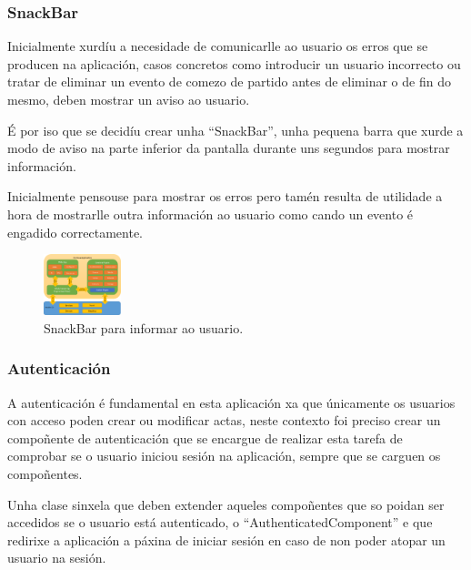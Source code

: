       \subsubsection{SnackBar}
      Inicialmente xurdíu a necesidade de comunicarlle ao usuario os erros que 
se producen na aplicación, casos concretos como introducir un usuario 
incorrecto ou tratar de eliminar un evento de comezo de partido antes de 
eliminar o de fin do mesmo, deben mostrar un aviso ao usuario.

      É por iso que se decidíu crear unha ``SnackBar'', unha pequena barra que 
xurde a modo de aviso na parte inferior da pantalla durante uns segundos para 
mostrar información.

      Inicialmente pensouse para mostrar os erros pero tamén resulta de 
utilidade a hora de mostrarlle outra información ao usuario como cando un 
evento é engadido correctamente.

      \begin{figure}[h!]
        \begin{center}
        \includegraphics[width=0.2\textwidth]{./img/cordova_arquitectura.png}
        \caption{SnackBar para informar ao usuario.}
        \end{center}
      \end{figure}

      \subsubsection{Autenticación}
      A autenticación é fundamental en esta aplicación xa que únicamente os 
usuarios con acceso poden crear ou modificar actas, neste contexto foi preciso 
crear un compoñente de autenticación que se encargue de realizar esta tarefa de 
comprobar se o usuario iniciou sesión na aplicación, sempre que se carguen os 
compoñentes.

      Unha clase sinxela que deben extender aqueles compoñentes que so poidan 
ser accedidos se o usuario está autenticado, o ``AuthenticatedComponent'' e que 
redirixe a aplicación a páxina de iniciar sesión en caso de non poder atopar un 
usuario na sesión.

